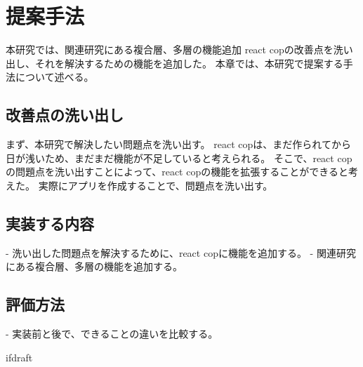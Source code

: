 \documentclass{jsarticle}
\begin{document}
    \fi
    \section{提案手法}
    本研究では、関連研究にある複合層、多層の機能追加
    react copの改善点を洗い出し、それを解決するための機能を追加した。
    本章では、本研究で提案する手法について述べる。

    \subsection{改善点の洗い出し}
    まず、本研究で解決したい問題点を洗い出す。
    react copは、まだ作られてから日が浅いため、まだまだ機能が不足していると考えられる。
    そこで、react copの問題点を洗い出すことによって、react copの機能を拡張することができると考えた。
    実際にアプリを作成することで、問題点を洗い出す。

    \subsection{実装する内容}
    - 洗い出した問題点を解決するために、react copに機能を追加する。
    - 関連研究にある複合層、多層の機能を追加する。

    \subsection{評価方法}
    - 実装前と後で、できることの違いを比較する。
















    \expandafter\ifx\csname ifdraft\endcsname\relax
\end{document}
